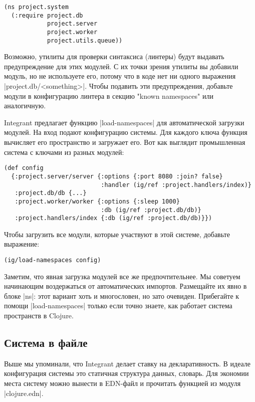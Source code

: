\begin{verbatim}
(ns project.system
  (:require project.db
            project.server
            project.worker
            project.utils.queue))
\end{verbatim}

Возможно, утилиты для проверки синтаксиса (линтеры) будут выдавать
предупреждение для этих модулей. С их точки зрения утилиты вы добавили модуль,
но не используете его, потому что в коде нет ни одного выражения
\spverb|project.db/<something>|. Чтобы подавить эти предупреждения, добавьте модули в
конфигурацию линтера в секцию "known namespaces" или аналогичную.

Integrant предлагает функцию \spverb|load-namespaces| для автоматической загрузки
модулей. На вход подают конфигурацию системы. Для каждого ключа функция
вычисляет его пространство и загружает его. Вот как выглядит промышленная
система с ключами из разных модулей:

\begin{verbatim}
(def config
  {:project.server/server {:options {:port 8080 :join? false}
                           :handler (ig/ref :project.handlers/index)}
   :project.db/db {...}
   :project.worker/worker {:options {:sleep 1000}
                           :db (ig/ref :project.db/db)}
   :project.handlers/index {:db (ig/ref :project.db/db)}})
\end{verbatim}

Чтобы загрузить все модули, которые участвуют в этой системе, добавьте
выражение:

\begin{verbatim}
(ig/load-namespaces config)
\end{verbatim}

Заметим, что явная загрузка модулей все же предпочтительнее. Мы советуем
начинающим воздержаться от автоматических импортов. Размещайте их явно в блоке
\spverb|ns|: этот вариант хоть и многословен, но зато очевиден. Прибегайте к помощи
\spverb|load-namespaces| только если точно знаете, как работает система пространств в
Clojure.

\subsection{Система в файле}

Выше мы упоминали, что Integrant делает ставку на декларативность. В идеале
конфигурация системы это статичная структура данных, словарь. Для экономии места
систему можно вынести в EDN-файл и прочитать функцией из модуля \spverb|clojure.edn|.

